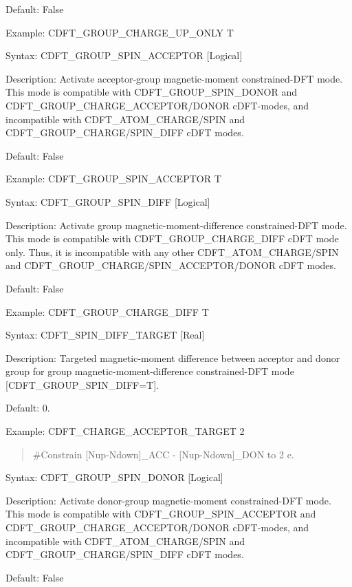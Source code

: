 \documentclass[letterpaper,10pt,english]{sphinxmanual}
\begin{document}
Default: False

Example: CDFT\_GROUP\_CHARGE\_UP\_ONLY T

Syntax: CDFT\_GROUP\_SPIN\_ACCEPTOR
{[}Logical{]}

Description: Activate acceptor-group magnetic-moment constrained-DFT
mode. This mode is compatible with CDFT\_GROUP\_SPIN\_DONOR and
CDFT\_GROUP\_CHARGE\_ACCEPTOR/DONOR cDFT-modes, and incompatible with
CDFT\_ATOM\_CHARGE/SPIN and CDFT\_GROUP\_CHARGE/SPIN\_DIFF cDFT modes.

Default: False

Example: CDFT\_GROUP\_SPIN\_ACCEPTOR T


Syntax: CDFT\_GROUP\_SPIN\_DIFF {[}Logical{]}

Description: Activate group magnetic-moment-difference constrained-DFT
mode. This mode is compatible with CDFT\_GROUP\_CHARGE\_DIFF cDFT mode
only. Thus, it is incompatible with any other CDFT\_ATOM\_CHARGE/SPIN
and CDFT\_GROUP\_CHARGE/SPIN\_ACCEPTOR/DONOR cDFT modes.

Default: False

Example: CDFT\_GROUP\_CHARGE\_DIFF T


Syntax: CDFT\_SPIN\_DIFF\_TARGET {[}Real{]}

Description: Targeted magnetic-moment difference between acceptor and
donor group for group magnetic-moment-difference constrained-DFT mode
{[}CDFT\_GROUP\_SPIN\_DIFF=T{]}.

Default: 0.

Example: CDFT\_CHARGE\_ACCEPTOR\_TARGET 2
\begin{quote}

\#Constrain {[}Nup-Ndown{]}\_ACC - {[}Nup-Ndown{]}\_DON to 2 e.
\end{quote}


Syntax: CDFT\_GROUP\_SPIN\_DONOR {[}Logical{]}

Description: Activate donor-group magnetic-moment constrained-DFT mode.
This mode is compatible with CDFT\_GROUP\_SPIN\_ACCEPTOR and
CDFT\_GROUP\_CHARGE\_ACCEPTOR/DONOR cDFT-modes, and incompatible with
CDFT\_ATOM\_CHARGE/SPIN and CDFT\_GROUP\_CHARGE/SPIN\_DIFF cDFT modes.

Default: False
\end{document}

